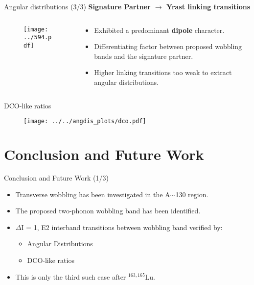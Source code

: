 \documentclass [11pt]{beamer}
\begin{document}
\begin{frame}{Angular distributions (3/3)}
\centering
\textbf{Signature Partner $\rightarrow$ Yrast linking transitions}
\begin{columns}[c]
\begin{column}{0.5\textwidth}
\begin{figure}
\texttt{[image: ../594.pdf]}
\end{figure}
\end{column}
\begin{column}{0.5\textwidth}
\begin{itemize}
\item {Exhibited a predominant \textbf{dipole} character.}
\item {Differentiating factor between proposed wobbling bands and the signature partner. }
\item {Higher linking transitions too weak to extract angular distributions.}
\end{itemize}
\end{column}
\end{columns}
\end{frame}


\begin{frame}{DCO-like ratios}
\vspace{-16pt}
\begin{figure}
\texttt{[image: ../../angdis\_plots/dco.pdf]}
\end{figure}
\end{frame}


\section{Conclusion and Future Work}

\begin{frame}{Conclusion and Future Work (1/3)}
\begin{itemize}
\item {Transverse wobbling has been investigated in the A$\sim$130 region.}
\item {The proposed two-phonon wobbling band has been identified.} 
\item {$\Delta\mathrm{I}$ = 1, E2 interband transitions between wobbling band verified by:}
\begin{itemize}
\item {Angular Distributions}
\item {DCO-like ratios}
\end{itemize}
\item {This is only the third such case after $^{163,165}$Lu.}
\end{itemize}
\end{frame}
\end{document}
